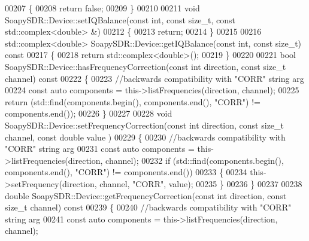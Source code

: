 \begin{DoxyCode}
00207 \textcolor{keyword}{}\{
00208     \textcolor{keywordflow}{return} \textcolor{keyword}{false};
00209 \}
00210 
00211 \textcolor{keywordtype}{void} SoapySDR::Device::setIQBalance(\textcolor{keyword}{const} \textcolor{keywordtype}{int}, \textcolor{keyword}{const} \textcolor{keywordtype}{size\_t}, \textcolor{keyword}{const} std::complex<double> &)
00212 \{
00213     \textcolor{keywordflow}{return};
00214 \}
00215 
00216 std::complex<double> SoapySDR::Device::getIQBalance(\textcolor{keyword}{const} \textcolor{keywordtype}{int}, \textcolor{keyword}{const} \textcolor{keywordtype}{size\_t})\textcolor{keyword}{ const}
00217 \textcolor{keyword}{}\{
00218     \textcolor{keywordflow}{return} std::complex<double>();
00219 \}
00220 
00221 \textcolor{keywordtype}{bool} SoapySDR::Device::hasFrequencyCorrection(\textcolor{keyword}{const} \textcolor{keywordtype}{int} direction, \textcolor{keyword}{const} \textcolor{keywordtype}{size\_t} channel)\textcolor{keyword}{ const}
00222 \textcolor{keyword}{}\{
00223     \textcolor{comment}{//backwards compatibility with "CORR" string arg}
00224     \textcolor{keyword}{const} \textcolor{keyword}{auto} components = this->listFrequencies(direction, channel);
00225     \textcolor{keywordflow}{return} (std::find(components.begin(), components.end(), \textcolor{stringliteral}{"CORR"}) != components.end());
00226 \}
00227 
00228 \textcolor{keywordtype}{void} SoapySDR::Device::setFrequencyCorrection(\textcolor{keyword}{const} \textcolor{keywordtype}{int} direction, \textcolor{keyword}{const} \textcolor{keywordtype}{size\_t} channel, \textcolor{keyword}{const} \textcolor{keywordtype}{double} value
      )
00229 \{
00230     \textcolor{comment}{//backwards compatibility with "CORR" string arg}
00231     \textcolor{keyword}{const} \textcolor{keyword}{auto} components = this->listFrequencies(direction, channel);
00232     \textcolor{keywordflow}{if} (std::find(components.begin(), components.end(), \textcolor{stringliteral}{"CORR"}) != components.end())
00233     \{
00234         this->setFrequency(direction, channel, \textcolor{stringliteral}{"CORR"}, value);
00235     \}
00236 \}
00237 
00238 \textcolor{keywordtype}{double} SoapySDR::Device::getFrequencyCorrection(\textcolor{keyword}{const} \textcolor{keywordtype}{int} direction, \textcolor{keyword}{const} \textcolor{keywordtype}{size\_t} channel)\textcolor{keyword}{ const}
00239 \textcolor{keyword}{}\{
00240     \textcolor{comment}{//backwards compatibility with "CORR" string arg}
00241     \textcolor{keyword}{const} \textcolor{keyword}{auto} components = this->listFrequencies(direction, channel);

\end{DoxyCode}
